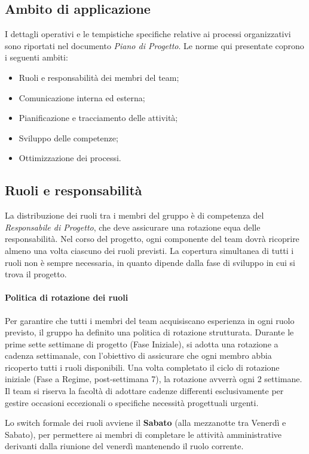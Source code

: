 \documentclass[a4paper, 11pt, oneside]{scrartcl} %
\begin{document}
\subsection{Ambito di applicazione}
I dettagli operativi e le tempistiche specifiche relative ai processi organizzativi sono riportati nel documento \emph{Piano di Progetto{\scriptsize{}}}.
Le norme qui presentate coprono i seguenti ambiti:
\begin{itemize}
    \item Ruoli e responsabilità dei membri del team;
    \item Comunicazione interna ed esterna;
    \item Pianificazione e tracciamento delle attività;
    \item Sviluppo delle competenze;
    \item Ottimizzazione dei processi.
\end{itemize}

\subsection{Ruoli e responsabilità}
La distribuzione dei ruoli tra i membri del gruppo è di competenza del \emph{Responsabile di Progetto}, che deve assicurare una rotazione equa delle responsabilità.
Nel corso del progetto, ogni componente del team dovrà ricoprire almeno una volta ciascuno dei ruoli previsti.
La copertura simultanea di tutti i ruoli non è sempre necessaria, in quanto dipende dalla fase di sviluppo in cui si trova il progetto.

\paragraph{Politica di rotazione dei ruoli}
Per garantire che tutti i membri del team acquisiscano esperienza in ogni ruolo previsto, il gruppo ha definito una politica di rotazione strutturata.
Durante le prime sette settimane di progetto (Fase Iniziale), si adotta una rotazione a cadenza settimanale, con l'obiettivo di assicurare che ogni membro abbia ricoperto tutti i ruoli disponibili.
Una volta completato il ciclo di rotazione iniziale (Fase a Regime, post-settimana 7), la rotazione avverrà ogni 2 settimane.
Il team si riserva la facoltà di adottare cadenze differenti esclusivamente per gestire occasioni eccezionali o specifiche necessità progettuali urgenti.

Lo switch formale dei ruoli avviene il \textbf{Sabato} (alla mezzanotte tra Venerdì e Sabato), per permettere ai membri di completare le attività amministrative derivanti dalla riunione del venerdì mantenendo il ruolo corrente.
\end{document}
